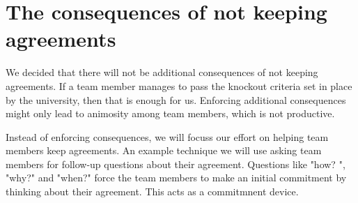 \section{The consequences of not keeping agreements}

We decided that there will not be additional consequences of not keeping
agreements. If a team member manages to pass the knockout criteria set in place by the university,
then that is enough for us. Enforcing additional consequences might only lead to animosity among team members,
which is not productive.

Instead of enforcing consequences, we will focuss our effort on helping team members keep agreements.
An example technique we will use asking team members for follow-up questions about their agreement. Questions like "how?
", "why?" and "when?" force the team members to make an initial commitment by thinking about their agreement. This acts
as a commitmnent device.

